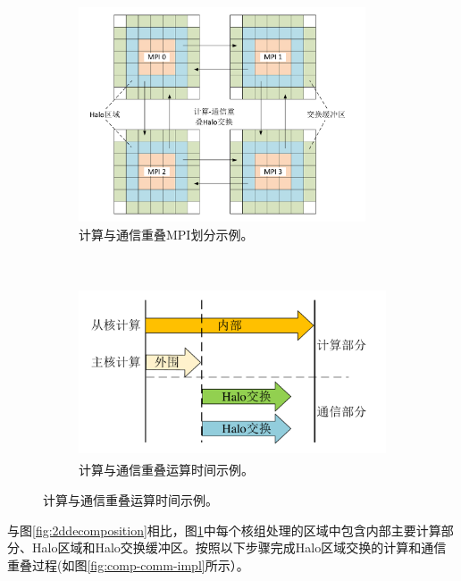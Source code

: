 \documentclass[degree=doctor]{thuthesis}
\begin{document}
\begin{figure}[ht]
    \centering
    \begin{subfigure}[b]{0.5\textwidth}
        \centering
        \includegraphics[height=2.5in]{comp-comm-overlap.pdf}
        \caption{计算与通信重叠MPI划分示例。}
        \label{fig:comp-comm-overlap}
    \end{subfigure}%
    ~
    \begin{subfigure}[b]{0.5\textwidth}
        \centering
        \includegraphics[height=2in]{overlappipe.pdf}
        \caption{计算与通信重叠运算时间示例。}
        \label{fig:overlappipe}
    \end{subfigure}
\end{figure}

与图\ref{fig:2ddecomposition}相比，图\ref{fig:comp-comm-overlap}中每个核组处理的区域中包含内部主要计算部分、Halo区域和Halo交换缓冲区。按照以下步骤完成Halo区域交换的计算和通信重叠过程(如图\ref{fig:comp-comm-impl}所示）。
\end{document}
